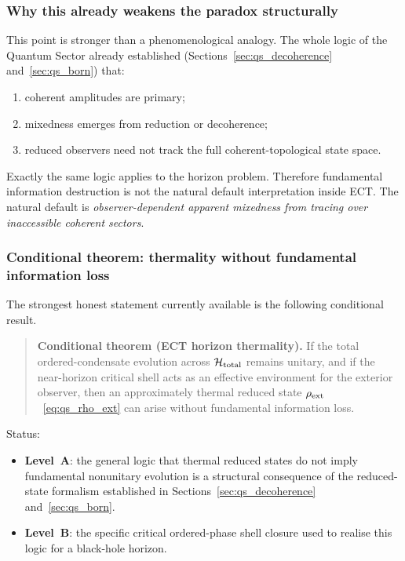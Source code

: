 \documentclass[11pt,a4paper]{article}
\numberwithin{equation}{section}
\begin{document}
\subsubsection*{Why this already weakens the paradox structurally}

This point is stronger than a phenomenological analogy.
The whole logic of the Quantum Sector already established
(Sections~\ref{sec:qs_decoherence} and~\ref{sec:qs_born}) that:
\begin{enumerate}[label=(\roman*)]
  \item coherent amplitudes are primary;
  \item mixedness emerges from reduction or decoherence;
  \item reduced observers need not track the full coherent-topological
    state space.
\end{enumerate}
Exactly the same logic applies to the horizon problem.
Therefore fundamental information destruction is not the natural default
interpretation inside ECT.
The natural default is
\emph{observer-dependent apparent mixedness from tracing over
inaccessible coherent sectors}.

\subsubsection*{Conditional theorem: thermality without fundamental information loss}

The strongest honest statement currently available is the following
conditional result.

\begin{quote}
\textbf{Conditional theorem (ECT horizon thermality).}
If the total ordered-condensate evolution across
$\mathcal{H}_{\rm total}$ remains unitary, and if the near-horizon
critical shell acts as an effective environment for the exterior
observer, then an approximately thermal reduced state
$\rho_{\rm ext}$~\eqref{eq:qs_rho_ext} can arise without fundamental
information loss.
\end{quote}

Status:
\begin{itemize}
  \item \textbf{Level~A}: the general logic that thermal reduced states
    do not imply fundamental nonunitary evolution is a structural
    consequence of the reduced-state formalism established in
    Sections~\ref{sec:qs_decoherence} and~\ref{sec:qs_born}.
  \item \textbf{Level~B}: the specific critical ordered-phase shell
    closure used to realise this logic for a black-hole horizon.
\end{itemize}
\end{document}
